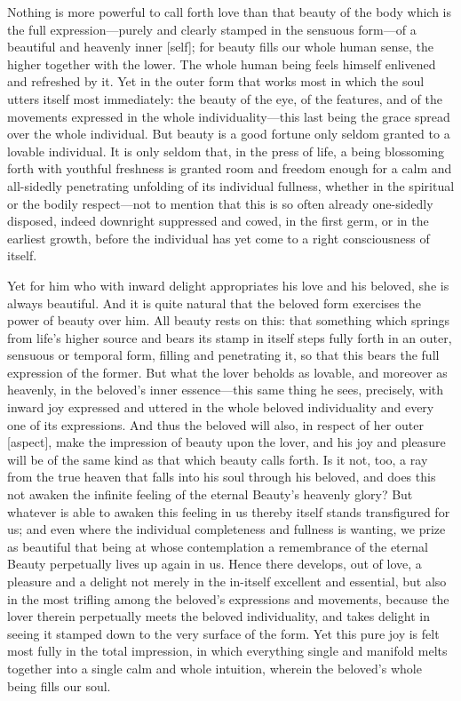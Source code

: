 \documentclass[12pt,a4paper]{book}
\begin{document}
Nothing is more powerful to call forth love than that beauty of the body
which is the full expression---purely and clearly stamped in the sensuous
form---of a beautiful and heavenly inner [self]; for beauty fills our whole
human sense, the higher together with the lower. The whole human being
feels himself enlivened and refreshed by it. Yet in the outer form that
works most in which the soul utters itself most immediately: the beauty of
the eye, of the features, and of the movements expressed in the whole
individuality---this last being the grace spread over the whole individual.
But beauty is a good fortune only seldom granted to a lovable individual.
It is only seldom that, in the press of life, a being blossoming forth with
youthful freshness is granted room and freedom enough for a calm and
all-sidedly penetrating unfolding of its individual fullness, whether in
the spiritual or the bodily respect---not to mention that this is so often
already one-sidedly disposed, indeed downright suppressed and cowed, in the
first germ, or in the earliest growth, before the individual has yet come
to a right consciousness of itself.

Yet for him who with inward delight appropriates his love and his beloved,
she is always beautiful. And it is quite natural that the beloved form
exercises the power of beauty over him. All beauty rests on this: that
something which springs from life's higher source and bears its stamp in
itself steps fully forth in an outer, sensuous or temporal form, filling
and penetrating it, so that this bears the full expression of the former.
But what the lover beholds as lovable, and moreover as heavenly, in the
beloved's inner essence---this same thing he sees, precisely, with inward
joy expressed and uttered in the whole beloved individuality and every one
of its expressions. And thus the beloved will also, in respect of her
outer [aspect], make the impression of beauty upon the lover, and his joy
and pleasure will be of the same kind as that which beauty calls forth. Is
it not, too, a ray from the true heaven that falls into his soul through
his beloved, and does this not awaken the infinite feeling of the eternal
Beauty's heavenly glory? But whatever is able to awaken this feeling in us
thereby itself stands transfigured for us; and even where the individual
completeness and fullness is wanting, we prize as beautiful that being at
whose contemplation a remembrance of the eternal Beauty perpetually lives
up again in us. Hence there develops, out of love, a pleasure and a delight
not merely in the in-itself excellent and essential, but also in the most
trifling among the beloved's expressions and movements, because the lover
therein perpetually meets the beloved individuality, and takes delight in
seeing it stamped down to the very surface of the form. Yet this pure joy
is felt most fully in the total impression, in which everything single and
manifold melts together into a single calm and whole intuition, wherein
the beloved's whole being fills our soul.
\end{document}
